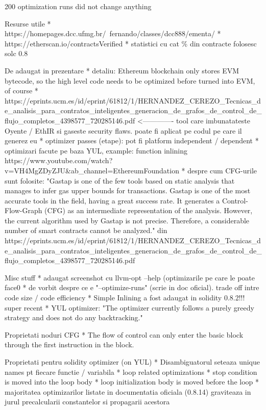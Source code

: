 200 optimization runs did not change anything



Resurse utile
* https://homepages.dcc.ufmg.br/~fernando/classes/dcc888/ementa/
* https://etherscan.io/contractsVerified
  * statistici cu cat \% din contracte folosesc solc 0.8


De adaugat in prezentare
* detaliu: Ethereum blockchain only stores EVM bytecode, so the high level code needs to be optimized before turned into EVM, of course
* https://eprints.ucm.es/id/eprint/61812/1/HERNANDEZ_CEREZO_Tecnicas_de_analisis_para_contratos_inteligentes_generacion_de_grafos_de_control_de_flujo_completos_4398577_720285146.pdf     <------------- tool care imbunatateste Oyente / EthIR si gaseste security flaws. poate fi aplicat pe codul pe care il generez eu
* optimizer passes (etape): pot fi platform independent / dependent
* optimizari facute pe baza YUL, example: function inlining https://www.youtube.com/watch?v=VH4MgZDyZJU&ab_channel=EthereumFoundation
* despre cum CFG-urile sunt folosite: "Gastap is one of the few tools based on static analysis that manages to infer gas upper
bounds for transactions. Gastap is one of the most accurate tools in the field, having a
great success rate. It generates a Control-Flow-Graph (CFG) as an intermediate representation of the analysis. However, the current algorithm used by Gastap is not precise.
Therefore, a considerable number of smart contracts cannot be analyzed." din https://eprints.ucm.es/id/eprint/61812/1/HERNANDEZ_CEREZO_Tecnicas_de_analisis_para_contratos_inteligentes_generacion_de_grafos_de_control_de_flujo_completos_4398577_720285146.pdf



Misc stuff
* adaugat screenshot cu llvm-opt --help (optimizarile pe care le poate face0
* de vorbit despre ce e "--optimize-runs" (scrie in doc oficial). trade off intre code size / code efficiency
* Simple Inlining a fost adaugat in solidity 0.8.2!!! super recent
* YUL optimizer: "The optimizer currently follows a purely greedy strategy and does not do any backtracking."

Proprietati noduri CFG
* The	flow	of	control	can	only	
enter	the	basic	block	through	
the	first	instruction	in	the	
block.

Proprietati pentru solidity optimizer (on YUL)
* Disambiguatorul seteaza unique names pt fiecare functie / variabila
* loop related optimizations
  * stop condition is moved into the loop body
  * loop initialization body is moved before the loop
  * majoritatea optimizarilor listate in documentatia oficiala (0.8.14) graviteaza in jurul precalcularii constantelor si propagarii acestora


